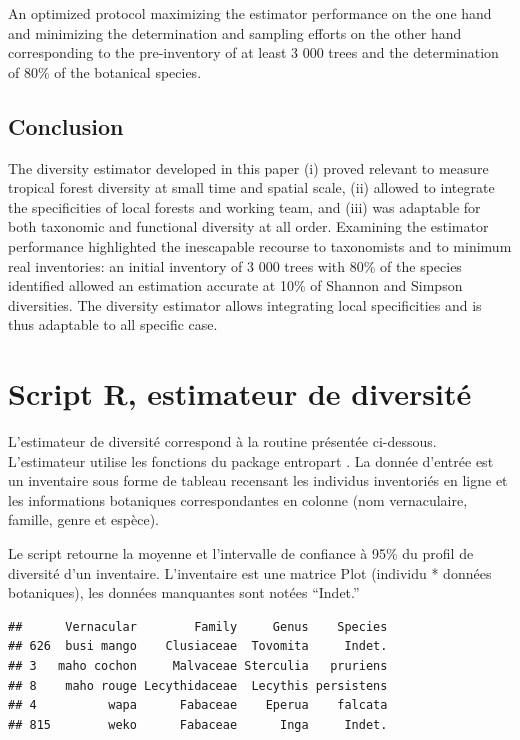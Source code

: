 \documentclass[
  11pt,
  french,
  A4paper,
  extrafontsizes,onecolumn,openright
  ]{memoir}
\begin{document}
An optimized protocol maximizing the estimator performance on the one
hand and minimizing the determination and sampling efforts on the other
hand corresponding to the pre-inventory of at least 3 000 trees and the
determination of 80\% of the botanical species.

\subsection{Conclusion}\label{conclusion}

The diversity estimator developed in this paper (i) proved relevant to
measure tropical forest diversity at small time and spatial scale, (ii)
allowed to integrate the specificities of local forests and working
team, and (iii) was adaptable for both taxonomic and functional
diversity at all order. Examining the estimator performance highlighted
the inescapable recourse to taxonomists and to minimum real inventories:
an initial inventory of 3 000 trees with 80\% of the species identified
allowed an estimation accurate at 10\% of Shannon and Simpson
diversities. The diversity estimator allows integrating local
specificities and is thus adaptable to all specific case.

\newpage

\section{Script R, estimateur de
diversité}\label{script-r-estimateur-de-diversite}

L'estimateur de diversité correspond à la routine présentée ci-dessous.
L'estimateur utilise les fonctions du package entropart
\autocite{Entropart2015}. La donnée d'entrée est un inventaire sous
forme de tableau recensant les individus inventoriés en ligne et les
informations botaniques correspondantes en colonne (nom vernaculaire,
famille, genre et espèce).

Le script retourne la moyenne et l'intervalle de confiance à 95\% du
profil de diversité d'un inventaire. L'inventaire est une matrice Plot
(individu * données botaniques), les données manquantes sont notées
``Indet.''

\begin{verbatim}
##      Vernacular        Family     Genus    Species
## 626  busi mango    Clusiaceae  Tovomita     Indet.
## 3   maho cochon     Malvaceae Sterculia   pruriens
## 8    maho rouge Lecythidaceae  Lecythis persistens
## 4          wapa      Fabaceae    Eperua    falcata
## 815        weko      Fabaceae      Inga     Indet.
\end{verbatim}
\end{document}
